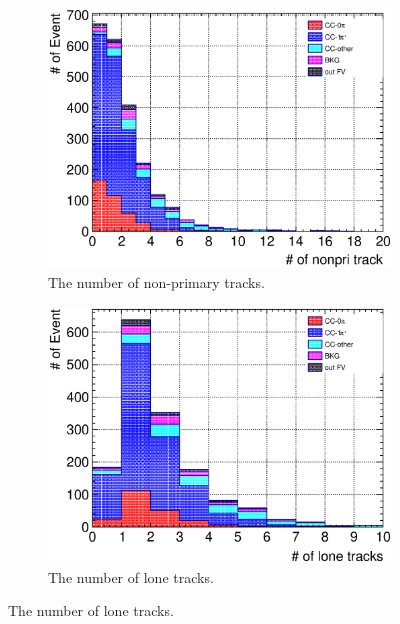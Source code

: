 \begin{figure}
\begin{subfigure}{\dbfigwid\textwidth}
       \label{subfig:tlpi-trknum-pri-sfgmu}
  \end{subfigure}
  \\
  \begin{subfigure}{\dbfigwid\textwidth}
       \includegraphics[width=\textwidth]{figures/sel/SFGmu_nnonpritrk_stack_al8.eps}
       \caption{The number of non-primary tracks.}
       \label{subfig:tlpi-trknum-nonpri-sfgmu}
  \end{subfigure}
  \begin{subfigure}{\dbfigwid\textwidth}
       \includegraphics[width=\textwidth]{figures/sel/SFGmu_nlon_stack_al8.eps}
       \caption{The number of lone tracks.}
       \label{subfig:tlpi-trknum-lone-sfgmu}
  \end{subfigure}

\end{figure}
